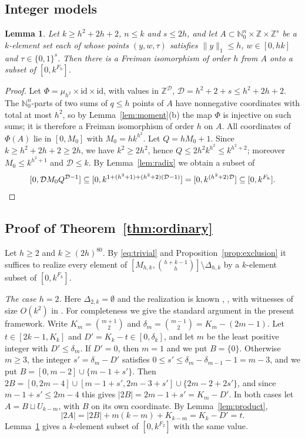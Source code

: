 \documentclass[11pt]{amsart}
\newtheorem{lemma}[theorem]{Lemma}
\theoremstyle{definition}
\theoremstyle{remark}
\numberwithin{equation}{section}
\newcommand{\Z}{\mathbb{Z}}
\newcommand{\N}{\mathbb{N}}
\begin{document}
\subsection{Integer models}

\begin{lemma}\label{lem:omodel}
Let $k\ge h^2+2h+2$, $n\le k$ and $s\le 2h$, and let $A\subset\N_0^n\times\Z\times\Z^s$ be a $k$-element set each of whose points $(y,w,\tau)$ satisfies $\|y\|_1\le h$, $w\in[0,hk]$ and $\tau\in\{0,1\}^s$. Then there is a Freiman isomorphism of order $h$ from $A$ onto a subset of $[0,k^{F_h}]$.
\end{lemma}

\begin{proof}
Let $\Phi=\mu_{h^2}\times\mathrm{id}\times\mathrm{id}$, with values in $\Z^{\mathcal D}$, $\mathcal D=h^2+2+s\le h^2+2h+2$. The $\N_0^n$-parts of two sums of $q\le h$ points of $A$ have nonnegative coordinates with total at most $h^2$, so by Lemma~\ref{lem:moment}(b) the map $\Phi$ is injective on such sums; it is therefore a Freiman isomorphism of order $h$ on $A$. All coordinates of $\Phi(A)$ lie in $[0,M_0]$ with $M_0=hk^{h^2}$. Let $Q=hM_0+1$. Since $k\ge h^2+2h+2\ge 2h$, we have $k^2\ge 2h^2$, hence $Q\le 2h^2k^{h^2}\le k^{h^2+2}$; moreover $M_0\le k^{h^2+1}$ and $\mathcal D\le k$. By Lemma~\ref{lem:radix} we obtain a subset of
\[
[0,\mathcal DM_0Q^{\mathcal D-1}]\subseteq[0,k^{1+(h^2+1)+(h^2+2)(\mathcal D-1)}]=[0,k^{(h^2+2)\mathcal D}]\subseteq[0,k^{F_h}].\qedhere
\]
\end{proof}

\subsection{Proof of Theorem~\ref{thm:ordinary}}
Let $h\ge 2$ and $k\ge(2h)^{80}$. By \eqref{eq:trivial} and Proposition~\ref{prop:exclusion} it suffices to realize every element of $[M_{h,k},\binom{h+k-1}h]\setminus\Delta_{h,k}$ by a $k$-element subset of $[0,k^{F_h}]$.

\emph{The case $h=2$.} Here $\Delta_{2,k}=\emptyset$ and the realization is known \cite{ES83}, \cite[Theorem~5]{Nat25}, with witnesses of size $O(k^2)$ in \cite{QC}. For completeness we give the standard argument in the present framework. Write $K_m=\binom{m+1}2$ and $\delta_m=\binom{m-1}2=K_m-(2m-1)$. Let $t\in[2k-1,K_k]$ and $D'=K_k-t\in[0,\delta_k]$, and let $m$ be the least positive integer with $D'\le\delta_m$. If $D'=0$, then $m=1$ and we put $B=\{0\}$. Otherwise $m\ge 3$, the integer $s'=\delta_m-D'$ satisfies $0\le s'\le\delta_m-\delta_{m-1}-1=m-3$, and we put $B=[0,m-2]\cup\{m-1+s'\}$. Then $2B=[0,2m-4]\cup[m-1+s',2m-3+s']\cup\{2m-2+2s'\}$, and since $m-1+s'\le 2m-4$ this gives $|2B|=2m-1+s'=K_m-D'$. In both cases let $A=B\sqcup U_{k-m}$, with $B$ on its own coordinate. By Lemma~\ref{lem:product},
\[
|2A|=|2B|+m(k-m)+K_{k-m}=K_k-D'=t.
\]
Lemma~\ref{lem:omodel} gives a $k$-element subset of $[0,k^{F_2}]$ with the same value.
\end{document}
